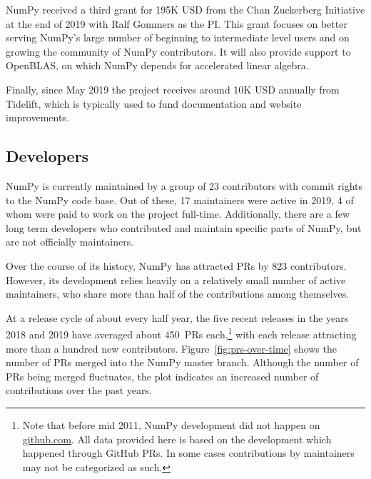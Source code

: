 NumPy received a third grant for 195K USD from the Chan Zuckerberg
Initiative at the end of 2019 with Ralf Gommers as the PI.
This grant focuses on better serving NumPy's large number of beginning
to intermediate level users and on growing the community of NumPy
contributors.
It will also provide support to OpenBLAS, on which NumPy depends for
accelerated linear algebra.

Finally, since May 2019 the project receives around 10K USD annually from
Tidelift, which is typically used to fund documentation and website
improvements.

\subsection*{Developers}

NumPy is currently maintained by a group of 23 contributors with commit rights
to the NumPy code base. Out of these, 17 maintainers were active in
2019, 4 of whom were paid to work on the project full-time.
Additionally, there are a few long term developers who contributed and maintain
specific parts of NumPy, but are not officially maintainers.

Over the course of its history, NumPy has attracted PRs by 823 contributors.
However, its development relies heavily on a relatively small number
of active maintainers, who share more than half of the contributions among
themselves.

At a release cycle of about every half year, the five recent releases in the years
2018 and 2019 have averaged about 450~PRs each,\footnote{
    Note that before mid 2011, NumPy development did not happen on \url{github.com}.
    All data provided here is based on the development which happened through GitHub
    PRs. In some cases contributions by maintainers may not be categorized as such.}
with each release attracting more than a hundred new contributors.
Figure~\ref{fig:prs-over-time} shows the number of PRs merged into the NumPy
master branch.
Although the number of PRs being merged fluctuates,
the plot indicates an increased number of contributions over the past
years.

